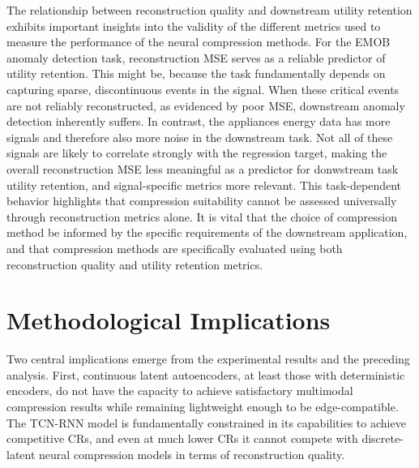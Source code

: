 The relationship between reconstruction quality and downstream utility retention exhibits important insights into the validity of the different metrics used to measure the performance of the neural compression methods. For the EMOB anomaly detection task, reconstruction MSE serves as a reliable predictor of utility retention. This might be, because the task fundamentally depends on capturing sparse, discontinuous events in the signal. When these critical events are not reliably reconstructed, as evidenced by poor MSE, downstream anomaly detection inherently suffers. In contrast, the appliances energy data has more signals and therefore also more noise in the downstream task. Not all of these signals are likely to correlate strongly with the regression target, making the overall reconstruction MSE less meaningful as a predictor for donwstream task utility retention, and signal-specific metrics more relevant. This task-dependent behavior highlights that compression suitability cannot be assessed universally through reconstruction metrics alone. It is vital that the choice of compression method be informed by the specific requirements of the downstream application, and that compression methods are specifically evaluated using both reconstruction quality and utility retention metrics.

\section{Methodological Implications}

Two central implications emerge from the experimental results and the preceding analysis. First, continuous latent autoencoders, at least those with deterministic encoders, do not have the capacity to achieve satisfactory multimodal compression results while remaining lightweight enough to be edge-compatible. The TCN-RNN model is fundamentally constrained in its capabilities to achieve competitive CRs, and even at much lower CRs it cannot compete with discrete-latent neural compression models in terms of reconstruction quality. 

